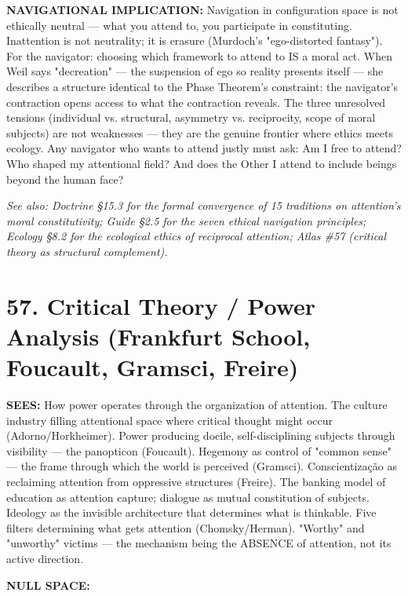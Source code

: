 \textbf{NAVIGATIONAL IMPLICATION:} Navigation in configuration space is not ethically neutral — what you attend to, you participate in constituting. Inattention is not neutrality; it is erasure (Murdoch's "ego-distorted fantasy"). For the navigator: choosing which framework to attend to IS a moral act. When Weil says "decreation" — the suspension of ego so reality presents itself — she describes a structure identical to the Phase Theorem's constraint: the navigator's contraction opens access to what the contraction reveals. The three unresolved tensions (individual vs. structural, asymmetry vs. reciprocity, scope of moral subjects) are not weaknesses — they are the genuine frontier where ethics meets ecology. Any navigator who wants to attend justly must ask: Am I free to attend? Who shaped my attentional field? And does the Other I attend to include beings beyond the human face?


\textit{See also: Doctrine §15.3 for the formal convergence of 15 traditions on attention's moral constitutivity; Guide §2.5 for the seven ethical navigation principles; Ecology §8.2 for the ecological ethics of reciprocal attention; Atlas \#57 (critical theory as structural complement).}


\bigskip\noindent\makebox[\textwidth]{\color{rulegray}\rule{5cm}{0.3pt}}\bigskip


\section*{57. Critical Theory / Power Analysis (Frankfurt School, Foucault, Gramsci, Freire)}


\textbf{SEES:} How power operates through the organization of attention. The culture industry filling attentional space where critical thought might occur (Adorno/Horkheimer). Power producing docile, self-disciplining subjects through visibility — the panopticon (Foucault). Hegemony as control of "common sense" — the frame through which the world is perceived (Gramsci). Conscientização as reclaiming attention from oppressive structures (Freire). The banking model of education as attention capture; dialogue as mutual constitution of subjects. Ideology as the invisible architecture that determines what is thinkable. Five filters determining what gets attention (Chomsky/Herman). "Worthy" and "unworthy" victims — the mechanism being the ABSENCE of attention, not its active direction.


\textbf{NULL SPACE:}

